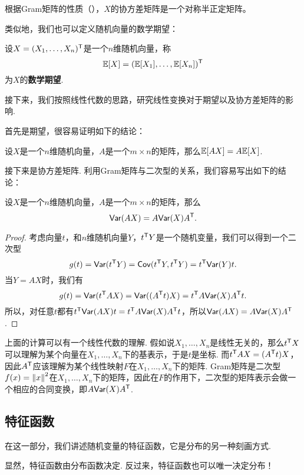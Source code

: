 根据Gram矩阵的性质（），$X$的协方差矩阵是一个对称半正定矩阵。

类似地，我们也可以定义随机向量的数学期望：

\begin{definition}[随机向量的数学期望]
设$X=(X_1,\dots,X_n)^{\mathsf{T}}$是一个$n$维随机向量，称
\[\mathbb{E}[X]=(\mathbb{E}[X_1],\dots,\mathbb{E}[X_n])^{\mathsf{T}}\]
为$X$的\textbf{数学期望}. 
\end{definition}

接下来，我们按照线性代数的思路，研究线性变换对于期望以及协方差矩阵的影响. 

首先是期望，很容易证明如下的结论：

\begin{proposition}\label{prop:expectation-linear}
设$X$是一个$n$维随机向量，$A$是一个$m\times n$的矩阵，那么$\mathbb{E}[AX]=A\mathbb{E}[X]$.
\end{proposition}

接下来是协方差矩阵. 利用Gram矩阵与二次型的关系，我们容易写出如下的结论：

\begin{proposition}\label{prop:covariance-linear}
设$X$是一个$n$维随机向量，$A$是一个$m\times n$的矩阵，那么
\[\mathsf{Var}(AX)=A\mathsf{Var}(X)A^{\mathsf{T}}.\]
\end{proposition}
\begin{proof}
考虑向量$t$，和$n$维随机向量$Y$，$t^{\mathsf{T}} Y$是一个随机变量，我们可以得到一个二次型
\[g(t)=\mathsf{Var}(t^{\mathsf{T}} Y)=\mathsf{Cov}(t^{\mathsf{T}} Y,t^{\mathsf{T}} Y)=t^{\mathsf{T}}\mathsf{Var}(Y)t.\]
当$Y=AX$时，我们有
\[g(t)=\mathsf{Var}(t^{\mathsf{T}} AX)=\mathsf{Var}((A^{\mathsf{T}} t)X)=t^{\mathsf{T}} A\mathsf{Var}(X)A^{\mathsf{T}} t.\]
所以，对任意$t$都有$t^{\mathsf{T}}\mathsf{Var}(AX)t=t^{\mathsf{T}} A\mathsf{Var}(X)A^{\mathsf{T}} t$，所以$\mathsf{Var}(AX)=A\mathsf{Var}(X)A^{\mathsf{T}}$.
\end{proof}

上面的计算可以有一个线性代数的理解. 假如说$X_1,\dots,X_n$是线性无关的，那么$t^{\mathsf{T}} X$可以理解为某个向量在$X_1,\dots,X_n$下的基表示，于是$t$是坐标. 而$t^{\mathsf{T}} AX=(A^{\mathsf{T}} t)X$，因此$A^{\mathsf{T}}$应该理解为某个线性映射$F$在$X_1,\dots,X_n$下的矩阵. Gram矩阵是二次型$f(x)=\left\|x\right\|^2$在$X_1,\dots,X_n$下的矩阵，因此在$F$的作用下，二次型的矩阵表示会做一个相应的合同变换，即$A\mathsf{Var}(X)A^{\mathsf{T}}$.

\subsection{特征函数} \label{subsec:characteristic-function}

在这一部分，我们讲述随机变量的特征函数，它是分布的另一种刻画方式. 

显然，特征函数由分布函数决定. 反过来，特征函数也可以唯一决定分布！

